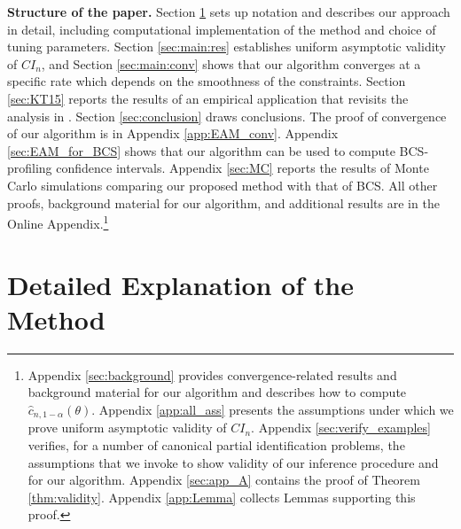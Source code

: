 \documentclass[letterpaper,11pt]{article}
\theoremstyle{myplain}
\theoremstyle{mydefinition}
\theoremstyle{myremark}
\renewcommand{\cite}{\citet}
\numberwithin{equation}{section}
\numberwithin{figure}{section}
\begin{document}
\textbf{Structure of the paper.} Section \ref{sec:setup} sets up notation and describes our approach in detail, including computational implementation of the method and choice of tuning parameters.
 Section \ref{sec:main:res} establishes uniform asymptotic validity of $CI_n$, and Section \ref{sec:main:conv} shows that our algorithm converges at a specific rate which depends on the smoothness of the constraints.
Section \ref{sec:KT15} reports the results of an empirical application that revisits the analysis in \cite[Section 8]{KT15}. Section \ref{sec:conclusion} draws conclusions.
The proof of convergence of our algorithm is in Appendix \ref{app:EAM_conv}. Appendix \ref{sec:EAM_for_BCS} shows that our algorithm can be used to compute BCS-profiling confidence intervals. Appendix \ref{sec:MC} reports the results of Monte Carlo simulations comparing our proposed method with that of BCS. All other proofs, background material for our algorithm, and additional results are in the Online Appendix.\footnote{Appendix \ref{sec:background} provides convergence-related results and background material for our algorithm and describes how to compute $\hat{c}_{n,1-\alpha}(\theta)$.
Appendix \ref{app:all_ass} presents the assumptions under which we prove uniform asymptotic validity of $CI_n$.
Appendix \ref{sec:verify_examples} verifies, for a number of canonical partial identification problems, the assumptions that we invoke to show validity of our inference procedure and for our algorithm.
Appendix \ref{sec:app_A} contains the proof of Theorem \ref{thm:validity}. Appendix \ref{app:Lemma} collects Lemmas supporting this proof.
}



\section{Detailed Explanation of the Method}
\label{sec:setup}
\end{document}
